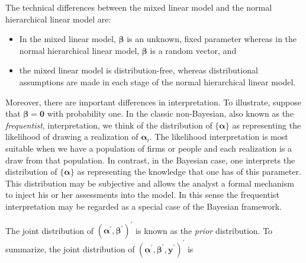 The technical differences between the mixed linear model and the
normal hierarchical linear model are:
\begin{itemize}

\item In the mixed linear model, $\boldsymbol \beta$ is an unknown, fixed parameter
whereas in the normal hierarchical linear model, $\boldsymbol \beta$
is a random vector, and

\item the mixed linear model is distribution-free, whereas distributional
assumptions are made in each stage of the normal hierarchical linear
model.

\end{itemize}

Moreover, there are important differences in interpretation. To
illustrate, suppose that $\boldsymbol \beta= \mathbf{0}$ with
probability one. In the classic non-Bayesian, also known as the
\emph{frequentist}, interpretation, we think of the distribution of
$\{\boldsymbol \alpha\}$ as representing the likelihood of drawing a
realization of $\boldsymbol \alpha _i$. The likelihood
interpretation is most suitable when we have a population of firms
or people and each realization is a draw from that population. In
contrast, in the Bayesian case, one interprets the distribution of
$\{\boldsymbol \alpha\}$ as representing the knowledge that one has
of this parameter. This distribution may be subjective and allows
the analyst a formal mechanism to inject his or her assessments into
the model. In this sense the frequentist interpretation may be
regarded as a special case of the Bayesian framework.

The joint distribution of $(\boldsymbol \alpha^{\prime}, \boldsymbol
\beta^{\prime})^{\prime}$ is known as the \emph{prior} distribution.
To summarize, the joint distribution of $(\boldsymbol
\alpha^{\prime}, \boldsymbol \beta^{\prime},
\mathbf{y}^{\prime})^{\prime}$ is

